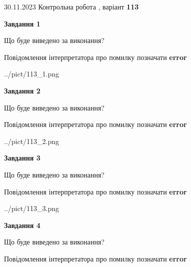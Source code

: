 \documentclass[12pt, ukrainian]{article}
\begin{document}
{{30.11.2023 Контрольна робота , варіант  \No \textbf { 113 }\par}}
{




{\begin {center}\textbf{Завдання 1}\end {center}}\par
Що буде виведено за виконання? \par
Повідомлення інтерпретатора про помилку позначати \textbf{error}

\begin{center}
	{../pict/113_1.png}
\end{center}
\newpage

{\begin {center}\textbf{Завдання 2}\end {center}}\par
Що буде виведено за виконання? \par
Повідомлення інтерпретатора про помилку позначати \textbf{error}

\begin{center}
	{../pict/113_2.png}
\end{center}
\newpage

{\begin {center}\textbf{Завдання 3}\end {center}}\par
Що буде виведено за виконання? \par
Повідомлення інтерпретатора про помилку позначати \textbf{error}

\begin{center}
	{../pict/113_3.png}
\end{center}
\newpage

{\begin {center}\textbf{Завдання 4}\end {center}}\par
Що буде виведено за виконання? \par
Повідомлення інтерпретатора про помилку позначати \textbf{error}

}
\end{document}
